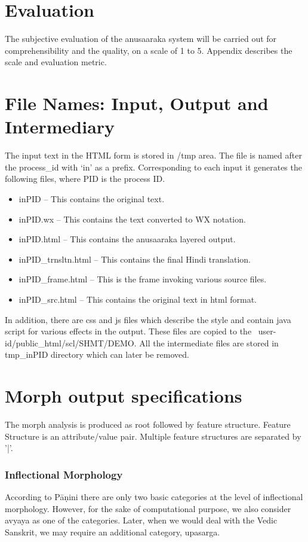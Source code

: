 \documentclass{llncs}
\begin{document}
\section{Evaluation}
The subjective evaluation of the anusaaraka system will be carried out for comprehensibility and the quality, on a scale of 1 to 5. 
Appendix  describes the scale and evaluation metric.

\appendix
\section{File Names: Input, Output and Intermediary}
The input text in the HTML form is stored in /tmp area. The file is named after the process\_id with `in' as a prefix. Corresponding to each input it generates the following files, where PID is the process ID.
\begin{itemize}
\item inPID -- This contains the original text.
\item inPID.wx  -- This contains the text converted to WX notation.
\item inPID.html  -- This contains the anusaaraka layered output.
\item inPID\_trnsltn.html	-- This contains the final Hindi translation.
\item inPID\_frame.html	 -- This is the frame invoking various source files.
\item inPID\_src.html	-- This contains the original text in html format.
\end{itemize}
In addition, there are css and js files which describe the style and contain java script for various effects in the output. These files are copied to the ~user-id/public\_html/scl/SHMT/DEMO. All the intermediate files are stored in tmp\_inPID directory which can later be removed.

\section{Morph output specifications}
The morph analysis is produced as root followed by feature structure.
Feature Structure is an attribute/value pair. Multiple feature structures are separated by '|'.

\subsubsection{Inflectional Morphology}
According to P{\=a}\d{n}ini there are only two basic categories at the level of inflectional morphology. However, for the sake of computational purpose, we also consider avyaya as one of the categories. Later, when we would deal with the Vedic Sanskrit, we may require an additional category, upasarga.\\
\end{document}
